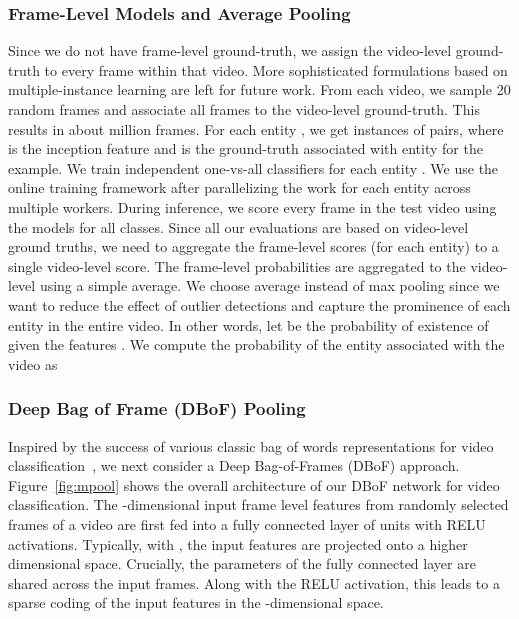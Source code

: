 \documentclass{sig-alternate-05-2015}
\begin{document}
\subsubsection{Frame-Level Models and Average Pooling}
\label{sec:frame_level_features}
Since we do not have frame-level ground-truth, we assign the video-level
ground-truth to every frame within that video. More sophisticated formulations
based on multiple-instance learning are left for future work. From each video,
we sample 20 random frames and associate all frames to the video-level
ground-truth. This results in about  million frames. For each entity ,
we get  instances of  pairs, where
 is the inception feature and 
is the ground-truth associated with entity  for the  example. We train
 independent one-vs-all classifiers for each entity . We use the online
training framework after parallelizing the work for each entity across multiple
workers. During inference, we score every frame in the test video using the models
for all classes. Since all our evaluations are based on video-level ground truths,
we need to aggregate the frame-level scores (for each entity) to a single
video-level score. The frame-level probabilities are aggregated to the video-level
using a simple average. We choose average instead of max pooling since we want to
reduce the effect of outlier detections and capture the prominence of each entity
in the entire video. In other words, let  be the probability
of existence of  given the features . We compute the probability
 of the entity  associated with the video  as




\subsubsection{Deep Bag of Frame (DBoF) Pooling}
\label{sec:dbof}
Inspired by the success of various classic bag of words representations for video classification~\cite{hollywood, Wang09evaluationof}, we next consider a Deep
 Bag-of-Frames (DBoF) approach. Figure~\ref{fig:mpool} shows the overall architecture of our DBoF network for video classification. The -dimensional
input frame level features from  randomly selected frames of a video are first fed into a fully connected layer of  units with RELU activations. Typically, with , the input features are projected onto a higher dimensional space. Crucially, the parameters of the fully connected layer are shared
across the  input frames. Along with the RELU activation, this leads to a sparse coding of the input features in the -dimensional space.
\end{document}
